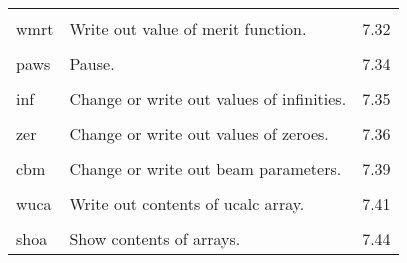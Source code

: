 \begin{center}
\begin{tabular}{lll}
\vspace{-3mm}& &\\
\hspace{1.5em}wmrt  &         Write out value of merit function.   & \hspace{2em}7.32\\
\vspace{-3mm}& &\\
\hspace{1.5em}paws  &         Pause.                               & \hspace{2em}7.34\\
\vspace{-3mm}& &\\
\hspace{1.5em}inf  &     Change or write out values of infinities. & \hspace{2em}7.35\\
\vspace{-3mm}& &\\
\hspace{1.5em}zer  &     Change or write out values of zeroes.     & \hspace{2em}7.36\\
\vspace{-3mm}& &\\
\hspace{1.5em}cbm  &     Change or write out beam parameters.      &
\hspace{2em}7.39\\
\vspace{-3mm}& &\\
\hspace{1.5em}wuca  &     Write out contents of ucalc array.      &
\hspace{2em}7.41 \\
\vspace{-3mm}& &\\
\hspace{1.5em}shoa    &   Show contents of arrays.       &  \hspace{2em}7.44\\
\end{tabular}
\end{center}

\newpage
